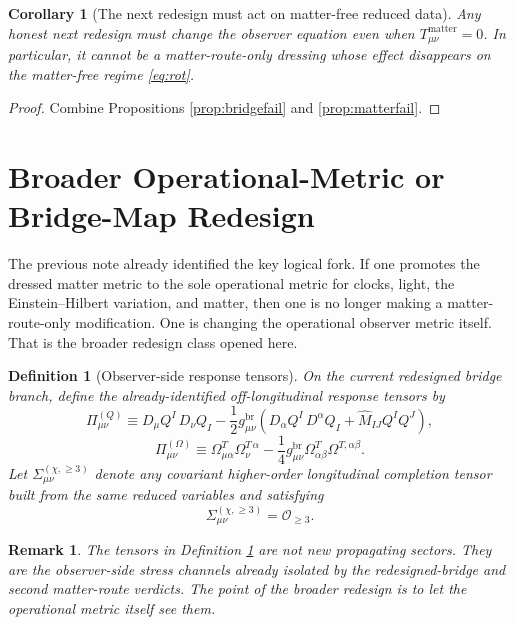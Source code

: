 \documentclass[11pt]{article}
\newcommand{\ReBridge}{g^{\mathrm{br}}}
\newcommand{\PiQ}{\Pi^{(Q)}}
\newcommand{\PiOmega}{\Pi^{(\Omega)}}
\newcommand{\SigmaLong}{\Sigma^{(\chi,\ge 3)}}
\newtheorem{definition}{Definition}
\newtheorem{remark}{Remark}
\newtheorem{corollary}{Corollary}
\begin{document}
\begin{corollary}[The next redesign must act on matter-free reduced data]
\label{cor:matterfree}
Any honest next redesign must change the observer equation even when \(T_{\mu\nu}^{\mathrm{matter}}=0\). In particular, it cannot be a matter-route-only dressing whose effect disappears on the matter-free regime \eqref{eq:rot}.
\end{corollary}

\begin{proof}
Combine Propositions \ref{prop:bridgefail} and \ref{prop:matterfail}.
\end{proof}

\section{Broader Operational-Metric or Bridge-Map Redesign}

The previous note already identified the key logical fork. If one promotes the dressed matter metric to the sole operational metric for clocks, light, the Einstein--Hilbert variation, and matter, then one is no longer making a matter-route-only modification. One is changing the operational observer metric itself. That is the broader redesign class opened here.

\begin{definition}[Observer-side response tensors]
\label{def:responses}
On the current redesigned bridge branch, define the already-identified off-longitudinal response tensors by
\begin{equation}
\PiQ_{\mu\nu}
\equiv
D_\mu Q^I\,D_\nu Q_I
-\frac12 \ReBridge_{\mu\nu}
\left(
D_\alpha Q^I\,D^\alpha Q_I+\widehat M_{IJ}Q^IQ^J
\right),
\label{eq:piQ}
\end{equation}
\begin{equation}
\PiOmega_{\mu\nu}
\equiv
\Omega_{\mu\alpha}^T\Omega_\nu^{T\,\alpha}
-\frac14 \ReBridge_{\mu\nu}\Omega_{\alpha\beta}^T\Omega^{T,\alpha\beta}.
\label{eq:piOmega}
\end{equation}
Let \(\SigmaLong_{\mu\nu}\) denote any covariant higher-order longitudinal completion tensor built from the same reduced variables and satisfying
\begin{equation}
\SigmaLong_{\mu\nu}=\mathcal O_{\ge 3}.
\label{eq:sigmalong}
\end{equation}
\end{definition}

\begin{remark}
The tensors in Definition \ref{def:responses} are not new propagating sectors. They are the observer-side stress channels already isolated by the redesigned-bridge and second matter-route verdicts. The point of the broader redesign is to let the operational metric itself see them.
\end{remark}
\end{document}
